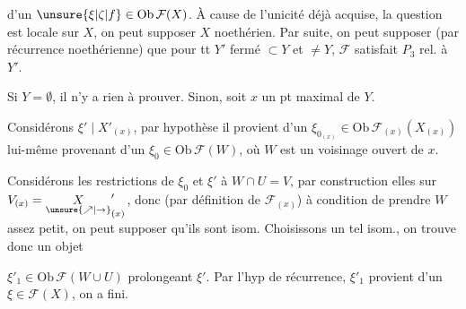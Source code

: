 
d'un $\unsure{\xi|\zeta|f}\in\mathrm{Ob}\,\mathcal F(X)$. À cause de l'unicité déjà acquise, la question est locale sur $X$, on peut supposer $X$ noethérien. Par suite, on peut supposer  (par récurrence noethérienne) que pour tt $Y'$ fermé $\subset Y$ et $\ne Y$,  $\mathcal F$ satisfait $P_3$ rel. à $Y'$.

 Si  $Y=\emptyset$, il n'y a rien à prouver. Sinon, soit $x$ un pt maximal de $Y$.

Considérons $\xi'\mid X'_{(x)}$, par hypothèse il provient d'un $\xi_{0_{(x)}}\in\mathrm{Ob}\,\mathcal F_{(x)}(X_{(x)})$ lui-même provenant d'un $\xi_0\in\mathrm{Ob}\,\mathcal F(W)$, où $W$ est un voisinage  ouvert de $x$.

 Considérons les restrictions de $\xi_0$ et $\xi'$ à $W\cap U=V$, par construction elles   sur $V_{(x)}=\underset{\unsure{\nearrow|\to}}{X}'_{(x)}$, donc (par définition de $\mathcal F_{(x)}$) à condition de prendre $W$ assez petit, on peut supposer qu'ils sont isom. Choisissons un tel isom., on trouve donc un objet

$\xi'_1\in\mathrm{Ob}\,\mathcal F(W\cup U)$ prolongeant $\xi'$. Par l'hyp de récurrence, $\xi'_1$ provient d'un $\xi\in\mathcal F(X)$, on a fini.

